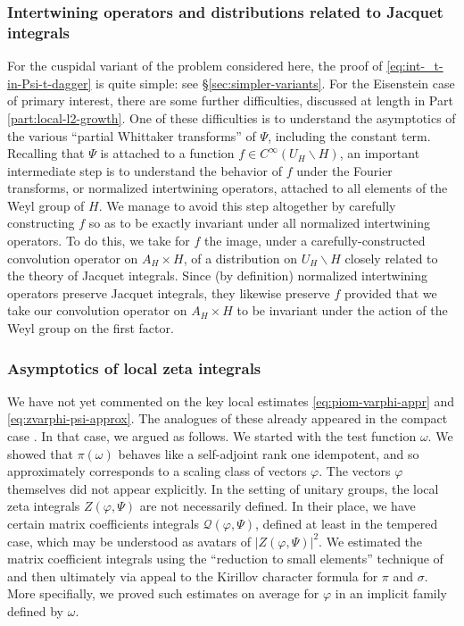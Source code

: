 \documentclass[reqno]{amsart}
\theoremstyle{plain} \newtheorem{theorem} {Theorem}
\theoremstyle{definition} \newtheorem{definition} [theorem] {Definition}
\theoremstyle{itplain} %
\numberwithin{equation}{section}
\numberwithin{theorem}{section}
\begin{document}
\subsubsection{Intertwining operators and distributions related to Jacquet integrals}\label{sec:intertw-oper-distr}
For the cuspidal variant of the problem considered here, the proof of \eqref{eq:int-_t-in-Psi-t-dagger} is quite simple: see \S\ref{sec:simpler-variants}.  For the Eisenstein case of primary interest, there are some further difficulties, discussed at length in Part \ref{part:local-l2-growth}.  One of these difficulties is to understand the asymptotics of the various ``partial Whittaker transforms'' of $\Psi$, including the constant term.  Recalling that $\Psi$ is attached to a function $f \in C^\infty(U_H \backslash H)$, an important intermediate step is to understand the behavior of $f$ under the Fourier transforms, or normalized intertwining operators, attached to all elements of the Weyl group of $H$.  We manage to avoid this step altogether by carefully constructing $f$ so as to be exactly invariant under all normalized intertwining operators.  To do this, we take for $f$ the image, under a carefully-constructed convolution operator on $A_H \times H$, of a distribution on $U_H \backslash H$ closely related to the theory of Jacquet integrals.  Since (by definition) normalized intertwining operators preserve Jacquet integrals, they likewise preserve $f$ provided that we take our convolution operator on $A_H \times H$ to be invariant under the action of the Weyl group on the first factor.


\subsubsection{Asymptotics of local zeta integrals}\label{sec:asympt-local-zeta}
We have not yet commented on the key local estimates \eqref{eq:piom-varphi-appr} and \eqref{eq:zvarphi-psi-approx}.  The analogues of these already appeared in the compact case \cite{2020arXiv201202187N}.  In that case, we argued as follows.  We started with the test function $\omega$.  We showed that $\pi(\omega)$ behaves like a self-adjoint rank one idempotent, and so approximately corresponds to a scaling class of vectors $\varphi$.  The vectors $\varphi$ themselves did not appear explicitly.  In the setting of unitary groups, the local zeta integrals $Z(\varphi, \Psi)$ are not necessarily defined.  In their place, we have certain matrix coefficients integrals $\mathcal{Q}(\varphi,\Psi)$, defined at least in the tempered case, which may be understood as avatars of $|Z(\varphi,\Psi)|^2$.  We estimated the matrix coefficient integrals using the ``reduction to small elements'' technique of \cite[\S19]{nelson-venkatesh-1} and then ultimately via appeal to the Kirillov character formula for $\pi$ and $\sigma$.  More specifially, we proved such estimates on average for $\varphi$ in an implicit family defined by $\omega$.
\end{document}
